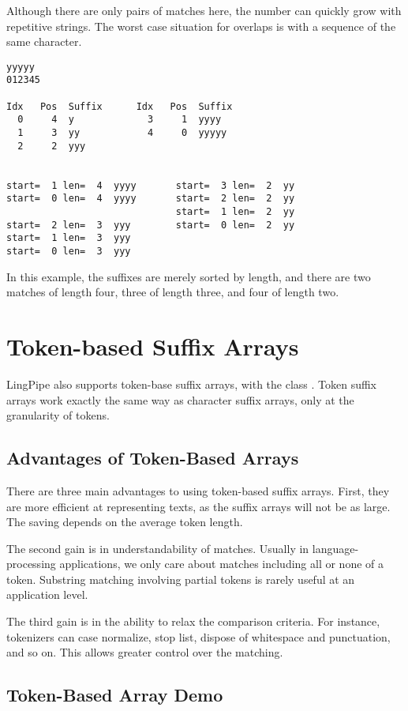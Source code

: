 Although there are only pairs of matches here, the number can
quickly grow with repetitive strings.  The worst case situation for
overlaps is with a sequence of the same character. 
%
\begin{verbatim}
yyyyy
012345

Idx   Pos  Suffix      Idx   Pos  Suffix
  0     4  y             3     1  yyyy
  1     3  yy            4     0  yyyyy
  2     2  yyy


start=  1 len=  4  yyyy       start=  3 len=  2  yy
start=  0 len=  4  yyyy       start=  2 len=  2  yy
                              start=  1 len=  2  yy
start=  2 len=  3  yyy        start=  0 len=  2  yy
start=  1 len=  3  yyy
start=  0 len=  3  yyy
\end{verbatim}
%
In this example, the suffixes are merely sorted by length, and
there are two matches of length four, three of length three, and
four of length two.


\section{Token-based Suffix Arrays}

LingPipe also supports token-base suffix arrays, with the class
.   Token suffix arrays work exactly the
same way as character suffix arrays, only at the granularity of
tokens. 

\subsection{Advantages of Token-Based Arrays}

There are three main advantages to using token-based suffix
arrays.  First, they are more efficient at representing texts,
as the suffix arrays will not be as large.  The saving depends
on the average token length. 

The second gain is in understandability of matches.  Usually in
language-processing applications, we only care about matches including
all or none of a token.  Substring matching involving partial tokens
is rarely useful at an application level.

The third gain is in the ability to relax the comparison criteria.
For instance, tokenizers can case normalize, stop list, dispose of
whitespace and punctuation, and so on.  This allows greater control
over the matching.

\subsection{Token-Based Array Demo}

